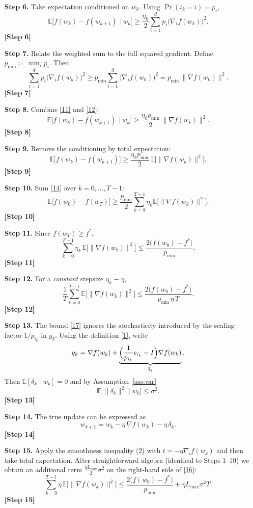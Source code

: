 \documentclass{article}
\newcommand{\E}{\mathbb{E}}
\begin{document}
\noindent\textbf{Step 6.}  Take expectation conditioned on $w_k$.
Using $\Pr(i_k=i)=p_i$,
\[
\E\!\bigl[f(w_{k})-f(w_{k+1})\mid w_k\bigr]
\ge \frac{\eta_k}{2}\sum_{i=1}^{d}p_i\bigl(\nabla_i f(w_k)\bigr)^{2}.
\tag{11}
\] 
\textbf{[Step 6]}

\noindent\textbf{Step 7.}  Relate the weighted sum to the full squared gradient.
Define $p_{\min}\coloneqq\min_i p_i$.  Then
\[
\sum_{i=1}^{d}p_i\bigl(\nabla_i f(w_k)\bigr)^{2}
\ge p_{\min}\sum_{i=1}^{d}\bigl(\nabla_i f(w_k)\bigr)^{2}
= p_{\min}\,\|\nabla f(w_k)\|^{2}.
\tag{12}
\] 
\textbf{[Step 7]}

\noindent\textbf{Step 8.}  Combine \eqref{11} and \eqref{12}:
\[
\E\!\bigl[f(w_{k})-f(w_{k+1})\mid w_k\bigr]
\ge \frac{\eta_k p_{\min}}{2}\,\|\nabla f(w_k)\|^{2}.
\tag{13}
\] 
\textbf{[Step 8]}

\noindent\textbf{Step 9.}  Remove the conditioning by total expectation:
\[
\E\!\bigl[f(w_{k})-f(w_{k+1})\bigr]
\ge \frac{\eta_k p_{\min}}{2}\,\E\!\bigl[\|\nabla f(w_k)\|^{2}\bigr].
\tag{14}
\] 
\textbf{[Step 9]}

\noindent\textbf{Step 10.}  Sum \eqref{14} over $k=0,\dots ,T-1$:
\[
\E\!\bigl[f(w_{0})-f(w_{T})\bigr]
\ge \frac{p_{\min}}{2}\sum_{k=0}^{T-1}\eta_k
      \E\!\bigl[\|\nabla f(w_k)\|^{2}\bigr].
\tag{15}
\] 
\textbf{[Step 10]}

\noindent\textbf{Step 11.}  Since $f(w_T)\ge f^{*}$,
\[
\sum_{k=0}^{T-1}\eta_k\,
\E\!\bigl[\|\nabla f(w_k)\|^{2}\bigr]
\le \frac{2\bigl(f(w_0)-f^{*}\bigr)}{p_{\min}}.
\tag{16}
\] 
\textbf{[Step 11]}

\noindent\textbf{Step 12.}  For a \emph{constant} stepsize $\eta_k\equiv\eta$,
\[
\frac{1}{T}\sum_{k=0}^{T-1}\E\!\bigl[\|\nabla f(w_k)\|^{2}\bigr]
\le \frac{2\bigl(f(w_0)-f^{*}\bigr)}{p_{\min}\,\eta\,T}.
\tag{17}
\] 
\textbf{[Step 12]}

\noindent\textbf{Step 13.}  The bound \eqref{17} ignores the stochasticity introduced
by the scaling factor $1/p_{i_k}$ in $g_k$.
Using the definition \eqref{1}, write
\[
g_k = \nabla f(w_k) + \underbrace{\Bigl(\frac{1}{p_{i_k}}e_{i_k}
      -I\Bigr)\nabla f(w_k)}_{\delta_k}.
\]
Then $\E[\delta_k\mid w_k]=0$ and by Assumption~\ref{ass:var}
\[
\E\!\bigl[\|\delta_k\|^{2}\mid w_k\bigr]\le\sigma^{2}.
\tag{18}
\] 
\textbf{[Step 13]}

\noindent\textbf{Step 14.}  The true update can be expressed as
\[
w_{k+1}=w_k-\eta\,\nabla f(w_k)-\eta\,\delta_k .
\tag{19}
\] 
\textbf{[Step 14]}

\noindent\textbf{Step 15.}  Apply the smoothness inequality (2) with $t=-\eta
\nabla_i f(w_k)$ and then take total expectation.  After straightforward
algebra (identical to Steps 1–10) we obtain an additional term
$\frac{\eta L_{\max}}{2}\sigma^{2}$ on the right‑hand side of \eqref{16}:
\[
\sum_{k=0}^{T-1}\eta\,\E\!\bigl[\|\nabla f(w_k)\|^{2}\bigr]
\le \frac{2\bigl(f(w_0)-f^{*}\bigr)}{p_{\min}}
    +\eta L_{\max}\sigma^{2}T .
\tag{20}
\] 
\textbf{[Step 15]}
\end{document}
